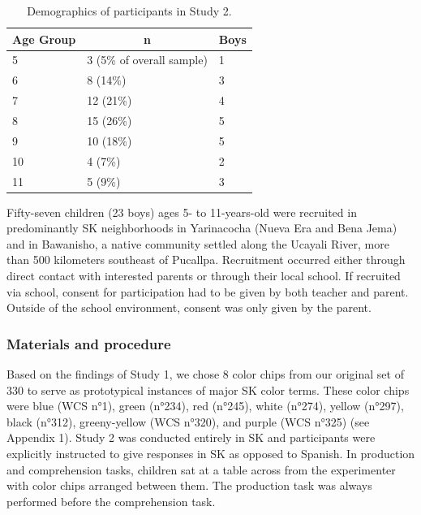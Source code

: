 \documentclass[
  english,
  ,man,floatsintext]{apa6}
\begin{document}
\begin{table}[tbp]

\begin{center}
\begin{threeparttable}

\caption{\label{tab:study2-demographics}Demographics of participants in Study 2.}

\begin{tabular}{lll}
\toprule
Age Group & \multicolumn{1}{c}{n} & \multicolumn{1}{c}{Boys}\\
\midrule
5 & 3 (5\% of overall sample) & 1\\
6 & 8 (14\%) & 3\\
7 & 12 (21\%) & 4\\
8 & 15 (26\%) & 5\\
9 & 10 (18\%) & 5\\
10 & 4 (7\%) & 2\\
11 & 5 (9\%) & 3\\
\bottomrule
\end{tabular}

\end{threeparttable}
\end{center}

\end{table}

Fifty-seven children (23 boys) ages 5- to 11-years-old were recruited in predominantly SK neighborhoods in Yarinacocha (Nueva Era and Bena Jema) and in Bawanisho, a native community settled along the Ucayali River, more than 500 kilometers southeast of Pucallpa. Recruitment occurred either through direct contact with interested parents or through their local school. If recruited via school, consent for participation had to be given by both teacher and parent. Outside of the school environment, consent was only given by the parent.

\hypertarget{materials-and-procedure-1}{%
\subsubsection{Materials and procedure}\label{materials-and-procedure-1}}

Based on the findings of Study 1, we chose 8 color chips from our original set of 330 to serve as prototypical instances of major SK color terms. These color chips were blue (WCS n°1), green (n°234), red (n°245), white (n°274), yellow (n°297), black (n°312), greeny-yellow (WCS n°320), and purple (WCS n°325) (see Appendix 1). Study 2 was conducted entirely in SK and participants were explicitly instructed to give responses in SK as opposed to Spanish. In production and comprehension tasks, children sat at a table across from the experimenter with color chips arranged between them. The production task was always performed before the comprehension task.
\end{document}

